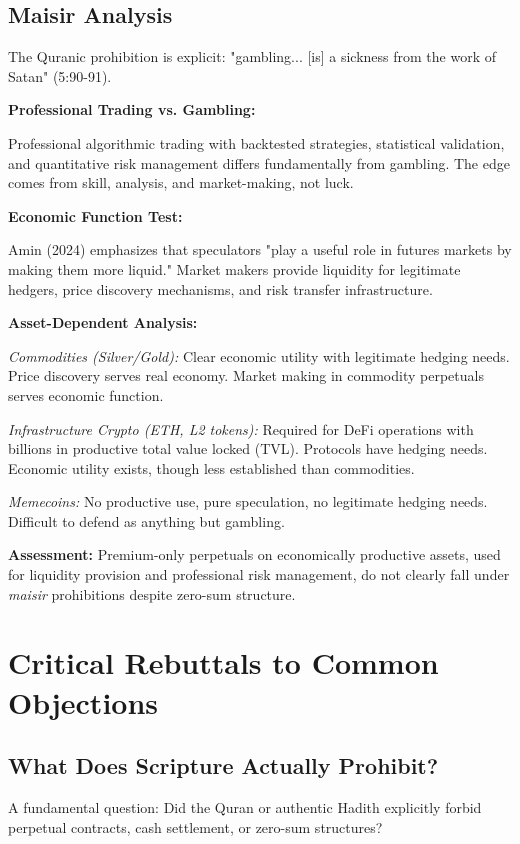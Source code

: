 \documentclass[10pt,twocolumn]{article}
\begin{document}
\subsection{Maisir Analysis}

The Quranic prohibition is explicit: "gambling... [is] a sickness from the work of Satan" (5:90-91).

\textbf{Professional Trading vs. Gambling:}

Professional algorithmic trading with backtested strategies, statistical validation, and quantitative risk management differs fundamentally from gambling. The edge comes from skill, analysis, and market-making, not luck.

\textbf{Economic Function Test:}

Amin (2024) emphasizes that speculators "play a useful role in futures markets by making them more liquid." Market makers provide liquidity for legitimate hedgers, price discovery mechanisms, and risk transfer infrastructure.

\textbf{Asset-Dependent Analysis:}

\textit{Commodities (Silver/Gold):} Clear economic utility with legitimate hedging needs. Price discovery serves real economy. Market making in commodity perpetuals serves economic function.

\textit{Infrastructure Crypto (ETH, L2 tokens):} Required for DeFi operations with billions in productive total value locked (TVL). Protocols have hedging needs. Economic utility exists, though less established than commodities.

\textit{Memecoins:} No productive use, pure speculation, no legitimate hedging needs. Difficult to defend as anything but gambling.

\textbf{Assessment:} Premium-only perpetuals on economically productive assets, used for liquidity provision and professional risk management, do not clearly fall under \textit{maisir} prohibitions despite zero-sum structure.

\section{Critical Rebuttals to Common Objections}

\subsection{What Does Scripture Actually Prohibit?}

A fundamental question: Did the Quran or authentic Hadith explicitly forbid perpetual contracts, cash settlement, or zero-sum structures?
\end{document}
